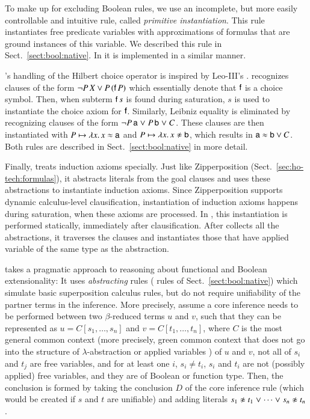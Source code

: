   To make up for excluding Boolean rules, we use an incomplete, but more
  easily controllable and intuitive rule, called \emph{primitive instantiation}. This
  rule instantiates free predicate variables with approximations of formulas
  that are ground instances of this variable. We described this rule in Sect.~\ref{sect:bool:native}.
  In \ehohii{} it is implemented in a similar manner.
  
  \ehohii{}'s handling of the Hilbert choice operator is inspired by Leo-III's
  \cite{sb-21-leo3}. \ehohii{}
  recognizes clauses of the form $\neg P \, X \lor P \, (\mathsf{f} \, P)$ which
  essentially denote that $\mathsf{f}$ is a choice symbol. Then, when subterm
  $\mathsf{f} \, s$ is found during saturation, $s$ is used to instantiate the choice
  axiom for $\mathsf{f}$. 
  Similarly, Leibniz equality is eliminated by
  recognizing clauses of the form  $\neg P \, \mathsf{a} \mathrel\lor P \, \mathsf{b} \mathrel\lor C$. These clauses are then
  instantiated with $P \mapsto \lambda x. \, x \approx \mathsf{a}$ and $P \mapsto \lambda
  x. \, x\noteq\cst{b}$, which results in $\mathsf{a} \approx \mathsf{b} \lor C$. Both rules
  are described in Sect.~\ref{sect:bool:native} in more detail.
  
  Finally, \ehohii{} treats induction axioms specially. Just like
  Zipperposition (Sect.~\ref{sec:ho-tech:formulas}), it abstracts literals
  from the goal clauses and uses these abstractions to instantiate induction
  axioms. Since Zipperposition supports dynamic calculus-level clausification,
  instantiation of induction axioms happens during saturation, when these axioms
  are processed. In \ehohii{}, this instantiation is performed statically,
  immediately after clausification. After \ehohii{} collects all the abstractions,
  it traverses the clauses and instantiates those that have applied variable of
  the same type as the abstraction.
  
  \begin{sloppypar}
     \ehohii{} takes a pragmatic approach to reasoning about
    functional and Boolean extensionality: It uses \emph{abstracting} rules ( rules of Sect.~\ref{sect:bool:native}) 
    which simulate basic superposition calculus rules,
    but do not require unifiability of the partner terms in the inference. More
    precisely, assume a core inference needs to be performed between two
    $\beta$-reduced terms $u$ and $v$, such that they can be represented as
    $u=C[s_1, \ldots, s_n]$ and $v=C[t_1, \ldots, t_n]$, where $C$ is the most general
    common context (more precisely, green common context that does not go into the structure of $\lambda$-abstraction or applied variables \cite{bbtvw-21-sup-lam}) of $u$ and $v$, not all of
    $s_i$ and $t_j$ are free variables, and for at least one $i$, $s_i \not= t_i$,
    $s_i$ and $t_i$ are not (possibly applied) free variables, and they are of Boolean or
    function type. Then, the conclusion is formed by taking the conclusion $D$ of
    the core inference rule (which would be created if $s$ and $t$ are unifiable)
    and adding literals $s_1 \noteq t_1 \llor \cdots \llor s_n \noteq t_n$.
      
  \end{sloppypar}
  

